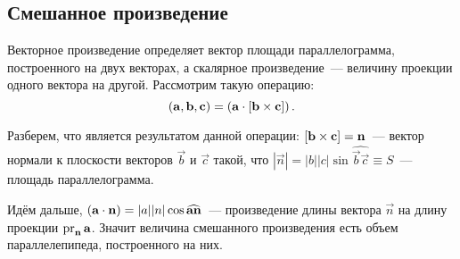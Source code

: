\subsection{Смешанное произведение}
\begin{wrapfigure}{r}{0.35\tw}
    \centering
    \vspace{-1pc}
    \caption{}
    \label{pic:math-triple}
\end{wrapfigure}

Векторное произведение определяет вектор площади параллелограмма, построенного на двух векторах, а скалярное произведение~--- величину проекции одного вектора на другой. Рассмотрим такую операцию:
\begin{equation}
    \left( \mathbf{a}, \mathbf{b}, \mathbf{c} \right) = \left(\mathbf{a} \cdot \mathbf{\left[\mathbf{b} \times \mathbf{c}\right]}\right).
\end{equation}

Разберем, что является результатом данной операции: $\left[\mathbf{b} \times \mathbf{c}\right] = \mathbf{n}$~--- вектор нормали к плоскости векторов $\vec{b}$ и $\vec{c}$ такой, что $|\vec{n}| = |b||c| \sin \widehat{\vec{b}\vec{c}} \equiv S$~--- площадь параллелограмма.

Идём дальше, $\left(\mathbf{a} \cdot \mathbf{n}\right) = |a||n|\cos \widehat{\mathbf{a} \mathbf{n}}$~--- произведение длины вектора $\vec{n}$ на длину проекции $\operatorname{pr}_{\mathbf{n}} \mathbf{a}$. Значит величина смешанного произведения есть объем параллелепипеда, построенного на них.

